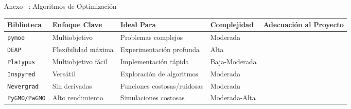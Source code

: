 \begin{frame}{Anexo \thesection~: Algoritmos de Optimización}
    \centering
    \label{tab:comparativa_GAs}
    \vspace{-0.1cm}
    \begin{adjustbox}{max width=0.9\textwidth, max height=0.4\textheight, keepaspectratio}
        \renewcommand{\arraystretch}{1.1}
        \begin{tabular}{@{}p{3cm} >{\centering\arraybackslash}p{3.5cm} >{\centering\arraybackslash}p{3.5cm} >{\centering\arraybackslash}p{3.5cm} >{\centering\arraybackslash}p{2.5cm}@{}}
            \toprule
            \textbf{Biblioteca} & \textbf{Enfoque Clave} & \textbf{Ideal Para} & \textbf{Complejidad} & \textbf{Adecuación al Proyecto} \\
            \midrule
            \rowcolor{yellow!25}
            \texttt{pymoo} & Multiobjetivo & Problemas complejos & Moderada & \color{green}{\checkmark} \\
            \midrule
            \texttt{DEAP} & Flexibilidad máxima & Experimentación profunda & Alta & \color{red}{\xmark} \\
            \midrule
            \texttt{Platypus} & Multiobjetivo fácil & Implementación rápida & Baja-Moderada & \color{red!40!orange}{\textasciitilde} \\
            \midrule
            \texttt{Inspyred} & Versátil & Exploración de algoritmos & Moderada & \color{red}{\xmark} \\
            \midrule
            \texttt{Nevergrad} & Sin derivadas & Funciones costosas/ruidosas & Moderada & \color{red!40!orange}{\textasciitilde} \\
            \midrule
            \texttt{PyGMO/PaGMO} & Alto rendimiento & Simulaciones costosas & Moderada-Alta & \color{red!40!orange}{\textasciitilde} \\
            \bottomrule
        \end{tabular}
    \end{adjustbox}
\end{frame}

